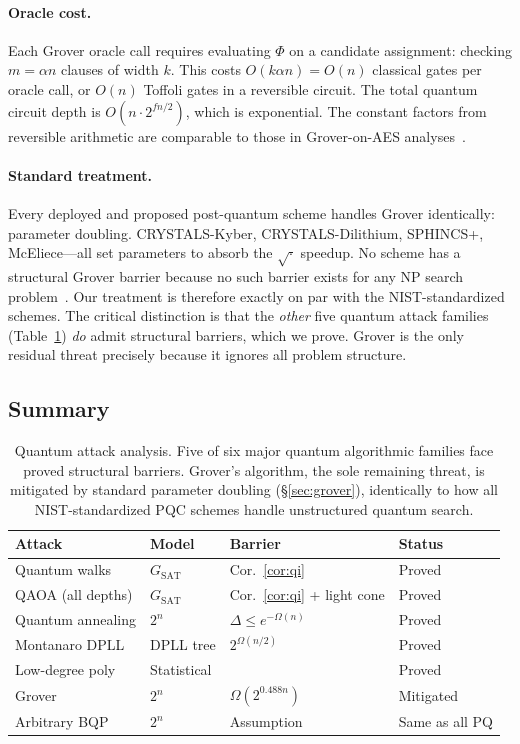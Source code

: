 \documentclass[11pt]{article}
\begin{document}
\paragraph{Oracle cost.}
Each Grover oracle call requires evaluating $\Phi$ on a candidate assignment: checking $m = \alpha n$ clauses of width $k$.  This costs $O(k \alpha n) = O(n)$ classical gates per oracle call, or $O(n)$ Toffoli gates in a reversible circuit.  The total quantum circuit depth is $O(n \cdot 2^{fn/2})$, which is exponential.  The constant factors from reversible arithmetic are comparable to those in Grover-on-AES analyses~\cite{GLRS16}.

\paragraph{Standard treatment.}
Every deployed and proposed post-quantum scheme handles Grover identically: parameter doubling.  CRYSTALS-Kyber, CRYSTALS-Dilithium, SPHINCS+, McEliece---all set parameters to absorb the $\sqrt{\cdot}$ speedup.  No scheme has a structural Grover barrier because no such barrier exists for any NP search problem~\cite{BBBV97}.  Our treatment is therefore exactly on par with the NIST-standardized schemes.  The critical distinction is that the \emph{other} five quantum attack families (Table~\ref{tab:quantum}) \emph{do} admit structural barriers, which we prove.  Grover is the only residual threat precisely because it ignores all problem structure.


\subsection{Summary}

\begin{table}[ht]
\centering
\caption{Quantum attack analysis.  Five of six major quantum algorithmic families face proved structural barriers.  Grover's algorithm, the sole remaining threat, is mitigated by standard parameter doubling (\S\ref{sec:grover}), identically to how all NIST-standardized PQC schemes handle unstructured quantum search.}\label{tab:quantum}
\begin{tabular}{@{}llll@{}}
\toprule
Attack & Model & Barrier & Status \\
\midrule
Quantum walks     & $G_{\mathrm{SAT}}$ & Cor.~\ref{cor:qi} & Proved \\
QAOA (all depths) & $G_{\mathrm{SAT}}$ & Cor.~\ref{cor:qi} + light cone & Proved \\
Quantum annealing & $2^n$   & $\Delta \leq e^{-\Omega(n)}$ & Proved \\
Montanaro DPLL    & DPLL tree & $2^{\Omega(n/2)}$ & Proved \\
Low-degree poly   & Statistical & \cite{BH22} & Proved \\
Grover            & $2^n$   & $\Omega(2^{0.488n})$ & Mitigated \\
Arbitrary BQP     & $2^n$   & Assumption & Same as all PQ \\
\bottomrule
\end{tabular}
\end{table}
\end{document}
